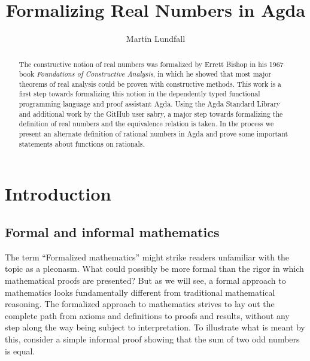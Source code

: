 \documentclass[11pt,a4paper]{article}
\title{Formalizing Real Numbers in Agda}
\author{Martin Lundfall}
\begin{document}
\maketitle
\begin{abstract}
The constructive notion of real numbers was formalized by Errett Bishop in his 1967 book \textit{Foundations of Constructive Analysis}, in which he showed that most major theorems of real analysis could be proven with constructive methods. This work is a first step towards formalizing this notion in the dependently typed functional programming language and proof assistant Agda. Using the Agda Standard Library and additional work by the GitHub user sabry, a major step towards formalizing the definition of real numbers and the equivalence relation is taken. In the process we present an alternate definition of rational numbers in Agda and prove some important statements about functions on rationals.
\end{abstract}
\begin{comment}
n\begin{abstract}
The decentralized infrastructure of the block chain technology Ethereum opens a new set of possibilities for sharing content in a programmable environment. In particular, it is highly suitable for creating a standard library of formalized mathematics to which everyone can add contributions. The database can in theory be automatically checked for validity and to avoid unnecessary repetitions, scanned for relevant results, or even serve as an interactive foundation of a formalized structure of knowledge. The trust-less nature of Ethereum allows communities to make democratic decisions on what contributions should be included in the database, or place bounties on particularly sought functions or proofs.
\end{abstract}
\end{comment}
\clearpage
\tableofcontents{}
\clearpage
\section{Introduction}\label{sec: Introduction}
\subsection{Formal and informal mathematics}\label{subsec: formal & informal}
The term ``Formalized mathematics'' might strike readers unfamiliar with the topic as a pleonasm. What could possibly be more formal than the rigor in which mathematical proofs are presented? But as we will see, a formal approach to mathematics looks fundamentally different from traditional mathematical reasoning. The formalized approach to mathematics strives to lay out the complete path from axioms and definitions to proofs and results, without any step along the way being subject to interpretation. To illustrate what is meant by this, consider a simple informal proof showing that the sum of two odd numbers is equal.
\end{document}
